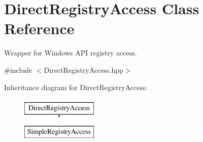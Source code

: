 \hypertarget{class_direct_registry_access}{}\section{Direct\+Registry\+Access Class Reference}
\label{class_direct_registry_access}


Wrapper for Windows A\+P\+I registry access.  




{\ttfamily \#include $<$Direct\+Registry\+Access.\+hpp$>$}

Inheritance diagram for Direct\+Registry\+Access\+:\begin{figure}[H]
\begin{center}
\leavevmode
\includegraphics[height=2.000000cm]{class_direct_registry_access}
\end{center}
\end{figure}
